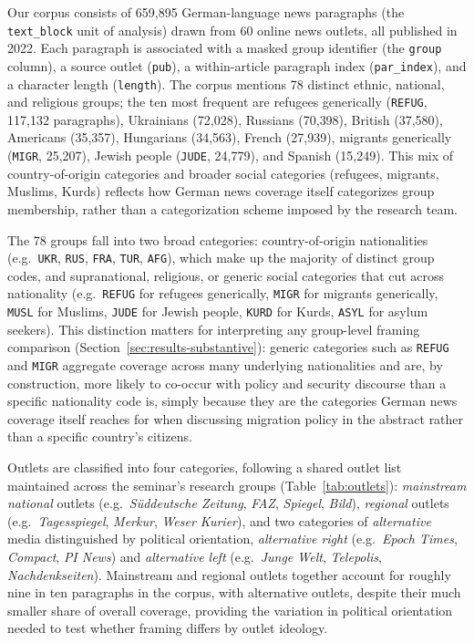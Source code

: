\documentclass[a4paper,oneside,bibliography=totoc]{scrartcl}
\begin{document}
Our corpus consists of 659{,}895 German-language news paragraphs (the \texttt{text\_block} unit of analysis) drawn from 60 online news outlets, all published in 2022. Each paragraph is associated with a masked group identifier (the \texttt{group} column), a source outlet (\texttt{pub}), a within-article paragraph index (\texttt{par\_index}), and a character length (\texttt{length}). The corpus mentions 78 distinct ethnic, national, and religious groups; the ten most frequent are refugees generically (\texttt{REFUG}, 117{,}132 paragraphs), Ukrainians (72{,}028), Russians (70{,}398), British (37{,}580), Americans (35{,}357), Hungarians (34{,}563), French (27{,}939), migrants generically (\texttt{MIGR}, 25{,}207), Jewish people (\texttt{JUDE}, 24{,}779), and Spanish (15{,}249). This mix of country-of-origin categories and broader social categories (refugees, migrants, Muslims, Kurds) reflects how German news coverage itself categorizes group membership, rather than a categorization scheme imposed by the research team.

The 78 groups fall into two broad categories: country-of-origin nationalities (e.g.\ \texttt{UKR}, \texttt{RUS}, \texttt{FRA}, \texttt{TUR}, \texttt{AFG}), which make up the majority of distinct group codes, and supranational, religious, or generic social categories that cut across nationality (e.g.\ \texttt{REFUG} for refugees generically, \texttt{MIGR} for migrants generically, \texttt{MUSL} for Muslims, \texttt{JUDE} for Jewish people, \texttt{KURD} for Kurds, \texttt{ASYL} for asylum seekers). This distinction matters for interpreting any group-level framing comparison (Section~\ref{sec:results-substantive}): generic categories such as \texttt{REFUG} and \texttt{MIGR} aggregate coverage across many underlying nationalities and are, by construction, more likely to co-occur with policy and security discourse than a specific nationality code is, simply because they are the categories German news coverage itself reaches for when discussing migration policy in the abstract rather than a specific country's citizens.

Outlets are classified into four categories, following a shared outlet list maintained across the seminar's research groups (Table~\ref{tab:outlets}): \emph{mainstream national} outlets (e.g.\ \textit{S\"uddeutsche Zeitung}, \textit{FAZ}, \textit{Spiegel}, \textit{Bild}), \emph{regional} outlets (e.g.\ \textit{Tagesspiegel}, \textit{Merkur}, \textit{Weser Kurier}), and two categories of \emph{alternative} media distinguished by political orientation, \emph{alternative right} (e.g.\ \textit{Epoch Times}, \textit{Compact}, \textit{PI News}) and \emph{alternative left} (e.g.\ \textit{Junge Welt}, \textit{Telepolis}, \textit{Nachdenkseiten}). Mainstream and regional outlets together account for roughly nine in ten paragraphs in the corpus, with alternative outlets, despite their much smaller share of overall coverage, providing the variation in political orientation needed to test whether framing differs by outlet ideology.
\end{document}
